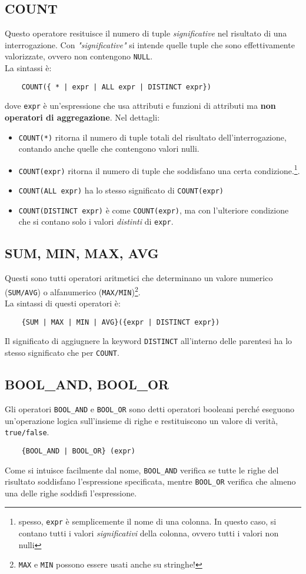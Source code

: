 \documentclass[12pt,a4paper]{book}
\begin{document}
	\subsection{COUNT}
	Questo operatore resituisce il numero di tuple \textit{significative} nel risultato di una interrogazione. Con \textit{"significative"} si intende quelle tuple che sono effettivamente valorizzate, ovvero non contengono \texttt{NULL}.\\
	La sintassi è:
	\begin{lstlisting}
	COUNT({ * | expr | ALL expr | DISTINCT expr})
	\end{lstlisting}
	dove \texttt{expr} è un'espressione che usa attributi e funzioni di attributi ma \textbf{non operatori di aggregazione}. Nel dettagli:
	\begin{itemize}
		\item \texttt{COUNT(*)} ritorna il numero di tuple totali del risultato dell'interrogazione, contando anche quelle che contengono valori nulli.
		\item \texttt{COUNT(expr)} ritorna il numero di tuple che soddisfano una certa condizione.\footnote{spesso, \texttt{expr} è semplicemente il nome di una colonna. In questo caso, si contano tutti i valori \textit{significativi} della colonna, ovvero tutti i valori non nulli}.
		\item \texttt{COUNT(ALL expr)} ha lo stesso significato di \texttt{COUNT(expr)}
		\item \texttt{COUNT(DISTINCT expr)} è come \texttt{COUNT(expr)}, ma con l'ulteriore condizione che si contano solo i valori \textit{distinti} di \texttt{expr}.
	\end{itemize}
	\subsection{SUM, MIN, MAX, AVG}
	Questi sono tutti operatori aritmetici che determinano un valore numerico (\texttt{SUM/AVG}) o alfanumerico (\texttt{MAX/MIN})\footnote{\texttt{MAX} e \texttt{MIN} possono essere usati anche su stringhe!}.\\
	La sintassi di questi operatori è:
	\begin{lstlisting}
	{SUM | MAX | MIN | AVG}({expr | DISTINCT expr})
	\end{lstlisting}
	Il significato di aggiugnere la keyword \texttt{DISTINCT} all'interno  delle parentesi ha lo stesso significato che per \texttt{COUNT}.
	\subsection{BOOL_AND, BOOL_OR}
	Gli operatori \texttt{BOOL_AND} e \texttt{BOOL_OR} sono detti operatori booleani perché eseguono un'operazione logica sull'insieme di righe e restituiscono un valore di verità, \texttt{true/false}.\\
	\begin{lstlisting}
	{BOOL_AND | BOOL_OR} (expr)
	\end{lstlisting}
	Come si intuisce facilmente dal nome, \texttt{BOOL_AND} verifica se tutte le righe del risultato soddisfano l'espressione specificata, mentre \texttt{BOOL_OR} verifica che almeno una delle righe soddisfi l'espressione.
\end{document}
